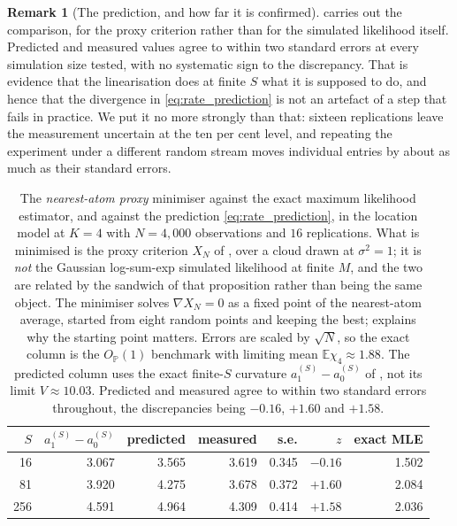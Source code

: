 \documentclass[11pt]{article}
\theoremstyle{definition}
\newtheorem{remark}[remark]{Remark}
\newcommand{\E}{\mathbb{E}}
\newcommand{\Pp}{\mathbb{P}}
\newcommand{\Op}{O_{\Pp}}
\begin{document}
\begin{remark}[The prediction, and how far it is confirmed]
\FloatBarrier

 carries out the comparison, for the proxy criterion rather than for the simulated likelihood itself. Predicted and measured values agree to within two standard errors at every simulation size tested, with no systematic sign to the discrepancy. That is evidence that the linearisation does at finite $S$ what it is supposed to do, and hence that the divergence in \eqref{eq:rate_prediction} is not an artefact of a step that fails in practice. We put it no more strongly than that: sixteen replications leave the measurement uncertain at the ten per cent level, and repeating the experiment under a different random stream moves individual entries by about as much as their standard errors.

\begin{table}[htbp]
\centering
\caption{The \emph{nearest-atom proxy} minimiser against the exact maximum likelihood estimator, and against the prediction \eqref{eq:rate_prediction}, in the location model at $K=4$ with $N=4{,}000$ observations and $16$ replications. What is minimised is the proxy criterion $X_N$ of , over a cloud drawn at $\sigma^2=1$; it is \emph{not} the Gaussian log-sum-exp simulated likelihood at finite $M$, and the two are related by the sandwich of that proposition rather than being the same object. The minimiser solves $\nabla X_N=0$ as a fixed point of the nearest-atom average, started from eight random points and keeping the best;  explains why the starting point matters. Errors are scaled by $\sqrt N$, so the exact column is the $\Op(1)$ benchmark with limiting mean $\E\chi_4\approx1.88$. The predicted column uses the exact finite-$S$ curvature $a_1^{(S)}-a_0^{(S)}$ of , not its limit $V\approx10.03$. Predicted and measured agree to within two standard errors throughout, the discrepancies being $-0.16$, $+1.60$ and $+1.58$.}
\label{tab:proxy_minimiser}
\begin{tabular}{rrrrrrr}
\toprule
$S$ & $a_1^{(S)}-a_0^{(S)}$ & predicted & measured & s.e. & $z$ & exact MLE \\
\midrule
16 & 3.067 & 3.565 & 3.619 & 0.345 & $-0.16$ & 1.502 \\
81 & 3.920 & 4.275 & 3.678 & 0.372 & $+1.60$ & 2.084 \\
256 & 4.591 & 4.964 & 4.309 & 0.414 & $+1.58$ & 2.036 \\
\bottomrule
\end{tabular}
\end{table}


\end{remark}
\end{document}
